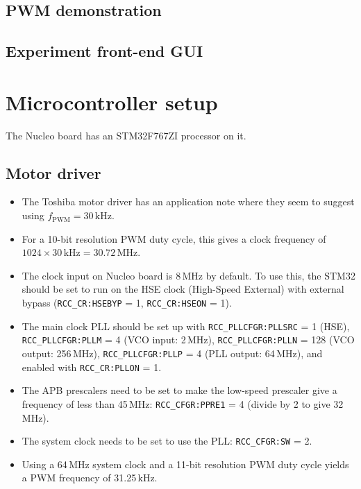 \documentclass[a4paper,11pt,article]{memoir}
\begin{document}
\subsection{PWM demonstration}


\subsection{Experiment front-end GUI}


\section{Microcontroller setup}

The Nucleo board has an STM32F767ZI processor on it.

\subsection{Motor driver}

\begin{itemize}
  \item{The Toshiba motor driver has an application note where they
    seem to suggest using $f_{\mathrm{PWM}} = 30\,\mathrm{kHz}$.}
  \item{For a 10-bit resolution PWM duty cycle, this gives a clock
    frequency of $1024 \times 30\,\mathrm{kHz} = 30.72\,\mathrm{MHz}$.}
  \item{The clock input on Nucleo board is 8\,MHz by default. To use
    this, the STM32 should be set to run on the HSE clock (High-Speed
    External) with external bypass (\texttt{RCC\_CR:HSEBYP} = 1,
    \texttt{RCC\_CR:HSEON} = 1).}
  \item{The main clock PLL should be set up with
    \texttt{RCC\_PLLCFGR:PLLSRC} = 1 (HSE), \texttt{RCC\_PLLCFGR:PLLM}
    = 4 (VCO input: 2\,MHz), \texttt{RCC\_PLLCFGR:PLLN} = 128 (VCO
    output: 256\,MHz), \texttt{RCC\_PLLCFGR:PLLP} = 4 (PLL output:
    64\,MHz), and enabled with \texttt{RCC\_CR:PLLON} = 1.}
  \item{The APB prescalers need to be set to make the low-speed
    prescaler give a frequency of less than 45\,MHz:
    \texttt{RCC\_CFGR:PPRE1} = 4 (divide by 2 to give 32\,MHz).}
  \item{The system clock needs to be set to use the PLL:
    \texttt{RCC\_CFGR:SW} = 2.}
  \item{Using a 64\,MHz system clock and a 11-bit resolution PWM duty
    cycle yields a PWM frequency of 31.25\,kHz.}
\end{itemize}
\end{document}
